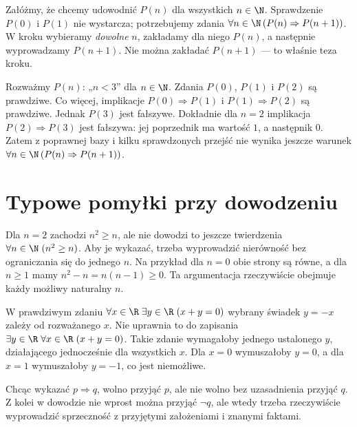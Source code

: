 \begin{przyklad}
Załóżmy, że chcemy udowodnić $P(n)$ dla wszystkich
$n\in\N$. Sprawdzenie $P(0)$ i $P(1)$ nie wystarcza;
potrzebujemy zdania $\forall n\in\N\,(P(n)\Rightarrow P(n+1))$.
W kroku wybieramy \emph{dowolne} $n$, zakładamy dla niego
$P(n)$, a następnie wyprowadzamy $P(n+1)$.
Nie można zakładać $P(n+1)$ --- to właśnie teza kroku.
\end{przyklad}

\begin{przyklad}
\label{ex:induction-counterexample-xli}
Rozważmy $P(n)$: „$n<3$” dla $n\in\N$.
Zdania $P(0)$, $P(1)$ i $P(2)$ są prawdziwe.
Co więcej, implikacje $P(0)\Rightarrow P(1)$
i $P(1)\Rightarrow P(2)$ są prawdziwe.
Jednak $P(3)$ jest fałszywe. Dokładnie dla $n=2$
implikacja $P(2)\Rightarrow P(3)$ jest fałszywa:
jej poprzednik ma wartość $1$, a następnik $0$.
Zatem z poprawnej bazy i kilku sprawdzonych
przejść nie wynika jeszcze warunek
$\forall n\in\N\,(P(n)\Rightarrow P(n+1))$.
\end{przyklad}

\section{Typowe pomyłki przy dowodzeniu}\label{sec:proof-errors}
\begin{przyklad}
Dla $n=2$ zachodzi $n^2\ge n$, ale nie dowodzi
to jeszcze twierdzenia
$\forall n\in\N\;(n^2\ge n)$.
Aby je wykazać, trzeba wyprowadzić nierówność
bez ograniczania się do jednego $n$.
Na przykład dla $n=0$ obie strony są równe,
a dla $n\ge1$ mamy $n^2-n=n(n-1)\ge0$.
Ta argumentacja rzeczywiście obejmuje każdy
możliwy naturalny $n$.
\end{przyklad}

\begin{przyklad}
W prawdziwym zdaniu
$\forall x\in\R\;\exists y\in\R\;(x+y=0)$
wybrany świadek $y=-x$ zależy od rozważanego $x$.
Nie uprawnia to do zapisania
$\exists y\in\R\;\forall x\in\R\;(x+y=0)$.
Takie zdanie wymagałoby jednego ustalonego $y$,
działającego jednocześnie dla wszystkich $x$.
Dla $x=0$ wymuszałoby $y=0$, a dla $x=1$
wymuszałoby $y=-1$, co jest niemożliwe.
\end{przyklad}

\begin{przyklad}
Chcąc wykazać $p\Rightarrow q$, wolno przyjąć
$p$, ale nie wolno bez uzasadnienia przyjąć $q$.
Z kolei w dowodzie nie wprost można przyjąć
$\neg q$, ale wtedy trzeba rzeczywiście
wyprowadzić sprzeczność z przyjętymi założeniami
i znanymi faktami.
\end{przyklad}

